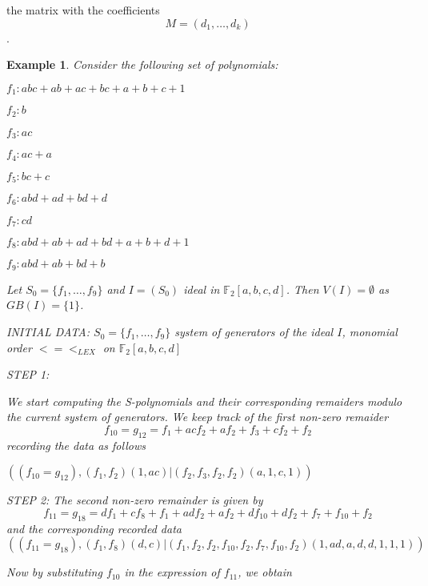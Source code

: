 \documentclass{article}
\theoremstyle{plain}
\newtheorem{exemp}{Example}[defn]
\begin{document}
the matrix with the coefficients  $$M=(d_1,\ldots,d_k)$$.
	\begin{exemp}
Consider the following set of polynomials:
\begin{center}
$f_1: abc + ab + ac + bc + a + b + c + 1$
\end{center}
\begin{center}
$f_2: b$
\end{center}
\begin{center}
$f_3: ac$
\end{center}
\begin{center}
$f_4: ac + a$
\end{center}
\begin{center}
$f_5: bc + c$
\end{center}
\begin{center}
$f_6: abd + ad + bd + d$
\end{center}
\newpage
\begin{center}
$f_7: cd$
\end{center}
\begin{center}
$f_8: abd + ab + ad + bd + a + b + d + 1$
\end{center}
\begin{center}
$f_9: abd + ab +bd + b$
\end{center}
 
Let $S_0=\{f_1,\ldots,f_9\}$ and $I=(S_0)$ ideal in $\mathbb{F}_2[a,b,c,d]$. Then $V(I)=\emptyset$ as $GB(I)=\{1\}$.

INITIAL DATA: $S_0=\{f_1,\ldots,f_9\}$ system of generators of the ideal $I$, monomial order $<=<_{LEX}$ on $\mathbb{F}_2[a,b,c,d]$

STEP 1:
 
 We start computing the S-polynomials and their corresponding remaiders modulo the current system of generators.
 We keep track of the first non-zero remaider
$$f_{10}=g_{12}=f_1+acf_2+af_2+f_3+cf_2+f_2$$
recording the data as follows

\begin{center}
$((f_{10}=g_{12}), (f_1,f_2)(1,ac)|(f_2,f_3,f_2,f_2)(a,1,c,1))$
\end{center}
STEP 2:
 The second non-zero remainder is given by
$$f_{11}=g_{18}=df_1+cf_8+f_1+adf_2+af_2+df_{10}+df_2+f_7+f_{10}+f_{2}$$
and the corresponding recorded data 
$$((f_{11}=g_{18}), (f_1,f_8)(d,c)|(f_1,f_2,f_2,f_{10},f_2,f_7,f_{10},f_{2})(1,ad,a,d,d,1,1,1))$$

  Now by substituting $f_{10}$ in the expression of $f_{11}$, we obtain


\end{exemp}
\end{document}
